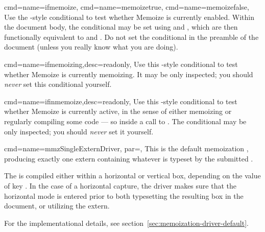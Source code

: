 \documentclass[a4paper,11pt]{article}
\begin{document}
\begin{doc}{
    cmd={name=ifmemoize},
    cmd={name=memoizetrue},
    cmd={name=memoizefalse},
  }
  Use the -style conditional  to test whether
  Memoize is currently enabled.  Within the document body, the conditional may
  be set using  and , which are then
  functionally equivalent to  and .  Do not set
  the conditional in the preamble of the document (unless you really know what
  you are doing).
\end{doc}

\begin{doc}{
    cmd={name=ifmemoizing,desc={readonly}},
  }
  Use this -style conditional to test whether Memoize is currently
  memoizing.  It may be only inspected; you should \emph{never} set this
  conditional yourself.
\end{doc}

\begin{doc}{
    cmd={name=ifinmemoize,desc={readonly}},
  }
  Use this -style conditional to test whether Memoize is currently
  active, in the sense of either memoizing or regularly compiling some code ---
  so inside a call to .  The conditional may be only inspected;
  you should \emph{never} set it yourself.
\end{doc}

\begin{doc}{
    cmd={name=mmzSingleExternDriver, par=},
  }
  This is the default memoization , producing exactly one extern
  containing whatever is typeset by the submitted .

  The  is compiled either within a horizontal or vertical box,
  depending on the value of key .  In the case of a horizontal
  capture, the driver makes sure that the horizontal mode is entered prior to
  both typesetting the resulting box in the document, or utilizing the extern.

  For the implementational details, see
  section~\ref{sec:memoization-driver-default}.
\end{doc}
\end{document}

